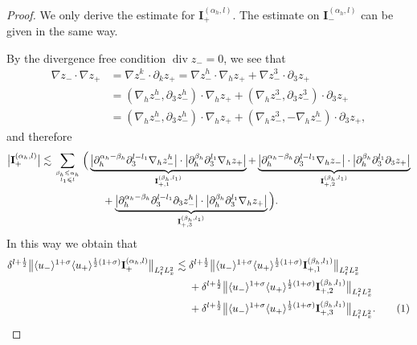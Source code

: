 \documentclass[10pt,reqno]{amsart}
\numberwithin{equation}{section}
\begin{document}
\begin{proof}
	We only derive the estimate for $\mathbf{I}_+^{(\alpha_h,l)}$. The estimate on $\mathbf{I}_-^{(\alpha_h,l)}$ can be given in the same way. 

 
By the divergence free condition $\operatorname{div}z_-=0$, we see that 
\begin{align*}
	\nabla z_-\cdot\nabla z_+
	&=\nabla z_-^k\cdot\partial_kz_+=\nabla z_-^h\cdot\nabla_hz_++\nabla z_-^3\cdot\partial_3z_+\\
	&=(\nabla_hz_-^h,\partial_3z_-^h) \cdot\nabla_hz_++(\nabla_hz_-^3,\partial_3 z_-^3)\cdot\partial_3z_+\\
	&=(\nabla_hz_-^h,\partial_3z_-^h) \cdot\nabla_hz_++(\nabla_hz_-^3,-\nabla_h z_-^h)\cdot\partial_3z_+,  
\end{align*}
and therefore
\begin{align*}
	\big|\mathbf{I}_{+}^{(\alpha_h,l)}\big|
	&\lesssim \sum_{\beta_h\leqslant \alpha_h\atop l_1\leqslant l}\Big(\underbrace{\big|\partial_h^{\alpha_h-\beta_h}\partial_3^{l-l_1}\nabla_h z_-^h\big|\cdot \big|\partial_h^{\beta_h}\partial_3^{l_1}\nabla_hz_+\big|}_{\mathbf{I}_{+,1}^{(\beta_h,l_1)}} +\underbrace{\big|\partial_h^{\alpha_h-\beta_h}\partial_3^{l-l_1}\nabla_h z_-\big|\cdot \big|\partial_h^{\beta_h}\partial_3^{l_1}\partial_3z_+\big|}_{\mathbf{I}_{+,2}^{(\beta_h,l_1)}}\\ 
	&\ \ \ \ \ \ \ \ \ \ \ \ \ \ \ \ \ \  +\underbrace{\big|\partial_h^{\alpha_h-\beta_h}\partial_3^{l-l_1}\partial_3 z_-^h\big|\cdot \big|\partial_h^{\beta_h}\partial_3^{l_1}\nabla_hz_+\big| }_{\mathbf{I}_{+,3}^{(\beta_h,l_1)}}\Big).
\end{align*}
In this way we obtain that 
\begin{align*}
	\delta^{l+\frac{1}{2}}\big\|\langle u_-\rangle^{1+\sigma}\langle u_+\rangle^{\frac{1}{2}(1+\sigma)}\mathbf{I}_{+}^{(\alpha_h,l)}\big\|_{L^2_tL^2_x}
	&\lesssim \delta^{l+\frac{1}{2}}\big\|\langle u_-\rangle^{1+\sigma}\langle u_+\rangle^{\frac{1}{2}(1+\sigma)}\mathbf{I}_{+,1}^{(\beta_h,l_1)}\big\|_{L^2_tL^2_x}\\
	&\ \ \ \ +\delta^{l+\frac{1}{2}}\big\|\langle u_-\rangle^{1+\sigma}\langle u_+\rangle^{\frac{1}{2}(1+\sigma)}\mathbf{I}_{+,2}^{(\beta_h,l_1)}\big\|_{L^2_tL^2_x}\\
	&\ \ \ \ +\delta^{l+\frac{1}{2}}\big\|\langle u_-\rangle^{1+\sigma}\langle u_+\rangle^{\frac{1}{2}(1+\sigma)}\mathbf{I}_{+,3}^{(\beta_h,l_1)}\big\|_{L^2_tL^2_x}.\stepcounter{equation}\tag{\theequation}\label{eqrho1}
\end{align*}


\end{proof}
\end{document}
